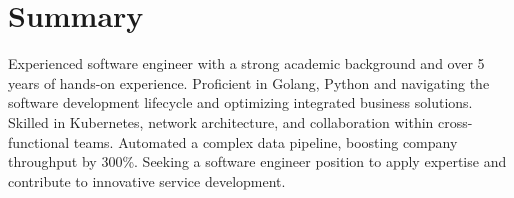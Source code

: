 \section{Summary}\closesection{}

Experienced software engineer with a strong academic background and over 5 years of hands-on experience.
Proficient in Golang, Python and navigating the software development lifecycle and optimizing integrated business solutions.
Skilled in Kubernetes, network architecture, and collaboration within cross-functional teams.
Automated a complex data pipeline, boosting company throughput by 300\%.
Seeking a software engineer position to apply expertise and contribute to innovative service development.